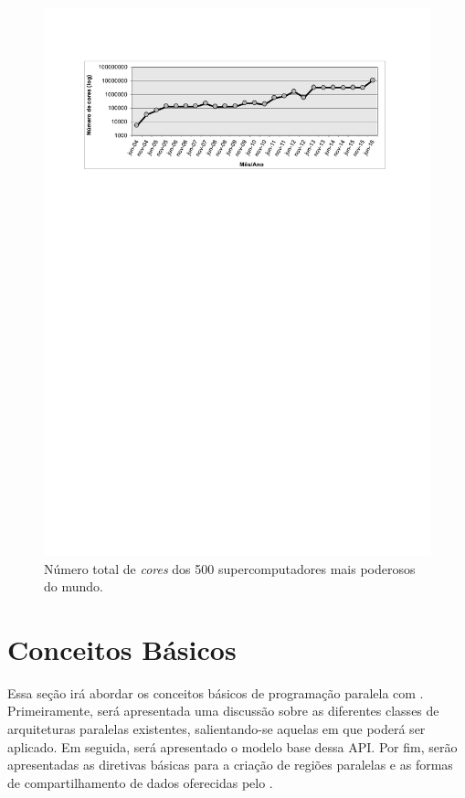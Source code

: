 \documentclass{SBCbookchapter}
\begin{document}
	\begin{figure}[t]
		\centering
		\includegraphics[width=\linewidth]{img/cores-top500.pdf}
		\caption{Número total de \textit{cores} dos 500 supercomputadores
		mais poderosos do mundo.}
		\label{fig:top500}
	\end{figure}


\section{Conceitos Básicos}
\label{sec:conceitos basicos}

	Essa seção irá abordar os conceitos básicos de programação paralela
	com \openmp. Primeiramente, será apresentada uma discussão sobre as
	diferentes classes de arquiteturas paralelas existentes,
	salientando-se aquelas em que \openmp poderá ser aplicado. Em
	seguida, será apresentado o modelo base dessa API.  Por fim, serão
	apresentadas as diretivas básicas para a criação de regiões
	paralelas e as formas de compartilhamento de dados oferecidas pelo
	\openmp.
\end{document}
